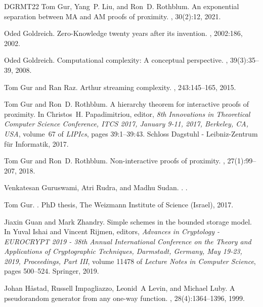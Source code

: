 \documentclass[10pt,a4paper]{article}
\theoremstyle{definition}
\begin{document}
\begin{thebibliography}{DGRMT22}
Tom Gur, Yang~P. Liu, and Ron~D. Rothblum.
\newblock An exponential separation between {{MA}} and {{AM}} proofs of proximity.
, 30(2):12, 2021.

Oded Goldreich.
\newblock Zero-{{Knowledge}} twenty years after its invention.
, 2002:186, 2002.

Oded Goldreich.
\newblock Computational complexity: A conceptual perspective.
, 39(3):35--39, 2008.

Tom Gur and Ran Raz.
\newblock Arthur streaming complexity.
, 243:145--165, 2015.

Tom Gur and Ron~D. Rothblum.
\newblock A hierarchy theorem for interactive proofs of proximity.
\newblock In Christos~H. Papadimitriou, editor, {\em 8th {{Innovations}} in {{Theoretical Computer Science Conference}}, {{ITCS}} 2017, {{January}} 9-11, 2017, {{Berkeley}}, {{CA}}, {{USA}}}, volume~67 of {\em {{LIPIcs}}}, pages 39:1--39:43. {Schloss Dagstuhl - Leibniz-Zentrum f\"ur Informatik}, 2017.

Tom Gur and Ron~D. Rothblum.
\newblock Non-interactive proofs of proximity.
, 27(1):99--207, 2018.

Venkatesan Guruswami, Atri Rudra, and Madhu Sudan.
.
.

Tom Gur.
.
\newblock PhD thesis, The Weizmann Institute of Science (Israel), 2017.

Jiaxin Guan and Mark Zhandry.
\newblock Simple schemes in the bounded storage model.
\newblock In Yuval Ishai and Vincent Rijmen, editors, {\em Advances in Cryptology - {EUROCRYPT} 2019 - 38th Annual International Conference on the Theory and Applications of Cryptographic Techniques, Darmstadt, Germany, May 19-23, 2019, Proceedings, Part {III}}, volume 11478 of {\em Lecture Notes in Computer Science}, pages 500--524. Springer, 2019.

Johan H{\aa}stad, Russell Impagliazzo, Leonid~A Levin, and Michael Luby.
\newblock A pseudorandom generator from any one-way function.
, 28(4):1364--1396, 1999.


\end{thebibliography}
\end{document}
